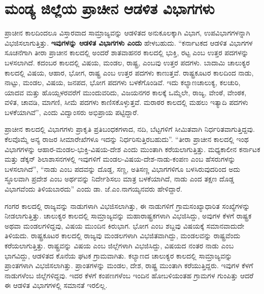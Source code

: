 \section*{ಮಂಡ್ಯ ಜಿಲ್ಲೆಯ ಪ್ರಾಚೀನ ಆಡಳಿತ ವಿಭಾಗಗಳು}

ಪ್ರಾಚೀನ ಕಾಲದಿಂದಲೂ ವಿಸ್ತಾರವಾದ ಸಾಮ್ರಾಜ್ಯವನ್ನು ಆಡಳಿತದ ಅನುಕೂಲಕ್ಕಾಗಿ ವಿಭಾಗ, ಉಪವಿಭಾಗಗಳನ್ನಾಗಿ ವಿಭಜಿಸಲಾಗುತ್ತಿತ್ತು. \textbf{ಇವುಗಳನ್ನು ಆಡಳಿತ ವಿಭಾಗಗಳು ಎಂದು }ಹೇಳಬಹುದು. “ಕರ್ನಾಟಕದ ಆಡಳಿತ ವಿಭಾಗಗಳ ಸೂಚನೆಗಾಗಿ ತೀರಾ ಪ್ರಾಚೀನ ಕಾಲದಲ್ಲಿ ಅಂದರೆ ಶಾತವಾಹನರ ಕಾಲದಲ್ಲಿ ಭುಕ್ತಿ, ರಟ್ಟ ಎಂಬ ಉತ್ತರ ಪದಗಳನ್ನು ಬಳಸಲಾಗಿದೆ. ಕದಂಬರ ಕಾಲದಲ್ಲಿ ವಿಷಯ, ಮಂಡಲ, ರಾಷ್ಟ್ರ, ಎಂಬವು ಉತ್ತರ ಪದಗಳು. ಬಾದಾಮಿ ಚಾಲುಕ್ಯರ ಕಾಲದಲ್ಲಿ ವಿಷಯ, ಆಹಾರ, ಭೋಗ, ರಾಷ್ಟ್ರ ಎಂಬ ಉತ್ತರ ಪದಗಳು ಕಾಣುತ್ತವೆ. ರಾಷ್ಟ್ರಕೂಟರ ಕಾಲದಿಂದ ನಾಡು, ನಾಟ್ಟು, ಮಂಡಲ, ವಿಷಯ, ಜನಪದ, ಭೋಗ ಪದಗಳು ಬಳಕೆಗೊಂಡಿವೆ. ಇದು ಕಲ್ಯಾಣಚಾಲುಕ್ಯ, ಕಲಚುರಿ, ಯಾದವ ಮತ್ತು ಹೊಯ್ಸಳರವರೆಗೆ ಮುಂದುವರಿದು, ವಿಜಯನಗರ ಕಾಲಕ್ಕೆ ಒಮ್ಮೆಲೇ, ರಾಜ್ಯ, ವೇಂಠೆ, ವೇಂಠಕ, ವಳಿತ, ಚಾವಡಿ, ಮಾಗಣಿ, ಸೀಮೆ ಪದಗಳು ಕಾಣಿಸಕೊಳ್ಳುತ್ತವೆ. ಮರಾಠರ ಕಾಲದಲ್ಲಿ ಮಹಲು ಇತ್ಯಾದಿ ಪದಗಳು ಬಳಕೆಯಾಗಿವೆ”, ಎಂದು ವಿದ್ವಾಂಸರು ಅಭಿಪ್ರಾಯ ಪಟ್ಟಿದ್ದಾರೆ.

ಪ್ರಾಚೀನ ಕಾಲದಲ್ಲಿ ವಿಭಾಗಗಳು ಪ್ರಾಕೃತಿ ಪ್ರತಿಬಂಧಕಗಳಾದ, ನದಿ, ಬೆಟ್ಟಗಳಿಗೆ ಸೀಮಿತವಾಗಿ ನಿರ್ಧರಿತವಾಗು\-ತ್ತಿದ್ದವು. ಕೆಲವೊಮ್ಮೆ ಅನ್ಯ ರಾಜರ ಸೀಮಾರೇಖೆಗಳೂ ಇದನ್ನು ನಿರ್ಧರಿಸುತ್ತಿರಬಹುದು”. “ತೀರಾ ಪ್ರಾಚೀನ ಕಾಲದಲ್ಲಿ ಇಂಥ ವಿಭಾಗಗಳನ್ನು ಆಹಾರ-ಮಂಡಲ-ಭುಕ್ತಿ-ವಿಷಯ-ದೇಶ ಎಂದು ಮುಂತಾಗಿ ಕರೆಯಲಾಗುತ್ತಿತ್ತು. ಮಧ್ಯಕಾಲೀನ ಕರ್ನಾಟಕ ಮತ್ತು ಡೆಕ್ಕನ್​ ಶಿಲಾಶಾಸನಗಳಲ್ಲಿ ಇವುಗಳಿಗೆ ಮಂಡಲ-ವಿಷಯ-ದೇಶ-ನಾಡು-ಕಂಪಣ ಎಂಬ ಹೆಸರುಗಳನ್ನು ಬಳಸಲಾಗಿದೆ”, “ನಾಡು ಎಂಬ ಪದವನ್ನು ದೊಡ್ಡ, ಸಣ್ಣ, ಅತಿಸಣ್ಣ ವಿಭಾಗಗಳಿಗೂ ಬಳಸಿರುವುದರಿಂದ ಅದು ಸ್ಥೂಲವಾಗಿ ಪ್ರದೇಶ ಎಂಬ ಅರ್ಥವನ್ನು ನಿರ್ದೇಶಿಸಲು ಮಾತ್ರ ಬಳಕೆಯಾಗಿದೆ, ನಾಡು ಎಂದ ತಕ್ಷಣ ದೊಡ್ಡ ವಿಭಾಗವೆಂದು ತಿಳಿಯಬಾರದು” ಎಂದು ಡಾ. ಜೆ.ಎಂ.ನಾಗಯ್ಯನವರು ಹೇಳಿದ್ದಾರೆ.

ಗಂಗರ ಕಾಲದಲ್ಲಿ ರಾಜ್ಯವನ್ನು ನಾಡುಗಳಾಗಿ ವಿಭಜಿಸಲಾಗಿತ್ತು, ಈ ನಾಡುಗಳಿಗೆ ಗ್ರಾಮಸಂಖ್ಯಾಧಾರಿತ ಸಂಖ್ಯೆಗಳನ್ನು ನೀಡಲಾಗುತ್ತಿತ್ತು. ಚಾಲುಕ್ಯರ ಕಾಲದಲ್ಲಿ ಸಾಮ್ರಾಜ್ಯವನ್ನು ಮಹಾರಾಷ್ಟ್ರಕಗಳಾಗಿ ವಿಭಜಿಸಿದ್ದು, ಅವುಗಳ ಕೆಳಗೆ ರಾಷ್ಟ್ರಕ ಅಥವಾ ಮಂಡಲಗಳಿದ್ದವು, ವಿಷಯ ಮುಂದಿನ ಕಿರುಭಾಗ. ಭೋಗ ಎಂಬ ಶಬ್ದವು ವಿಷಯಕ್ಕೆ ಸಮಾನವಾದುದೇ ತಿಳಿಯದು. ರಾಷ್ಟ್ರಕೂಟರ ಕಾಲದಲ್ಲಿ ರಾಜ್ಯವು ಮಂಡಲಗಳಾಗಿ ವಿಭಜಿತವಾಗಿದ್ದು, ಮಂಡಲವನ್ನು ರಾಷ್ಟ್ರವೆಂದು ಕರೆಯಲಾಗುತ್ತಿತ್ತು. ರಾಷ್ಟ್ರವನ್ನು ವಿಷಯ ಎಂಬ ಜಿಲ್ಲೆಗಳಾಗಿ ವಿಭಜಿಸಿದ್ದು, ವಿಷಯದ ನಂತರ ನಾಡು ಎಂಬ ಭಾಗವಿದ್ದು, ಆಡಳಿತದ ಕೊನೆಯ ಘಟಕ ಗ್ರಾಮವಾಗಿತು. ಕಲ್ಯಾಣದ ಚಾಲುಕ್ಯರ ಕಾಲದಲ್ಲಿ ಸಾಮ್ರಾಜ್ಯವನ್ನು ಪ್ರಾಂತಗಳಾಗಿ ವಿಭಜಿಸಲಾಗಿತ್ತು. ಪ್ರಾಂತಗಳನ್ನು ಮಂಡಲ, ದೇಶ, ರಾಷ್ಟ್ರ ಮುಂತಾಗಿ ಕರೆಯುತ್ತಿದ್ದರು. ಇವುಗಳ ಕೆಳಗೆ ನಾಡುಗಳೆಂಬ ಜಿಲ್ಲೆಗಳಿದ್ದವು. ಇದರ ಕೆಳಗೆ ಕಂಪಣಗಳೆಂಬ ಇಂದಿನ ಹೋಬಳಿಯಂತಹ ಗ್ರಾಮಗಳ ಗುಂಪಿತ್ತು ಆದರೆ ಈ ಆಡಳಿತ ವಿಭಾಗಗಳಲ್ಲಿ ಸಮಾನತೆ ಇರಲಿಲ್ಲ.

